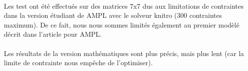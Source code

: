  \paragraph{} Les test ont été effectués sur des matrices 7x7 dus aux limitations de contraintes dans la version étudiant de AMPL avec le solveur knitro (300 contraintes maximum).  De ce fait, nous nous sommes limités également au premier modèlé décrit dans l'article pour AMPL.

\paragraph{} Les résultats de la version mathématiques sont plus précis, mais plus lent (car la limite de contrainte nous empêche de l'optimiser). 


\begin{figure}
        \begin{minipage}{.5\textwidth}
        \end{minipage}
        \begin{minipage}{.5\textwidth}

\end{minipage}
\end{figure}
